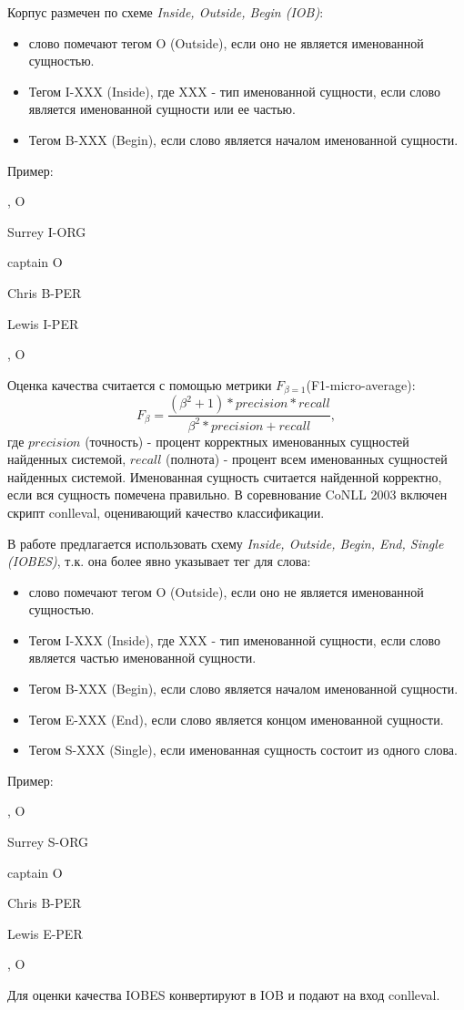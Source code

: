   Корпус размечен по схеме \textit{Inside, Outside, Begin (IOB)}:
  \begin{itemize}
  \item слово помечают тегом O (Outside), если оно не является именованной сущностью.
  \item Тегом I-XXX (Inside), где XXX - тип именованной сущности, если слово
    является именованной сущности или ее частью.
  \item Тегом B-XXX (Begin), если слово является началом именованной сущности.
  \end{itemize}

  Пример:
  \centerline{}
  \centerline{, O}
  \centerline{Surrey I-ORG}
  \centerline{captain O}
  \centerline{Chris B-PER}
  \centerline{Lewis I-PER}
  \centerline{, O}

  Оценка качества считается с помощью метрики $F_{\beta=1}$(F1-micro-average):
  \[
    F_\beta = \frac{(\beta^2 + 1) * precision * recall}{\beta^2*precision + recall},
  \]
  где $precision$ (точность) - процент корректных именованных сущностей
  найденных системой, $recall$ (полнота) - процент всем именованных сущностей
  найденных системой. Именованная сущность считается найденной корректно, если
  вся сущность помечена правильно.
  В соревнование CoNLL 2003 включен скрипт conlleval, оценивающий качество классификации.

  В работе \citep{collobert2011natural} предлагается использовать схему
  \textit{Inside, Outside, Begin, End, Single (IOBES)}, т.к. она более явно указывает
  тег для слова:
  \begin{itemize}
  \item слово помечают тегом O (Outside), если оно не является именованной сущностью.
  \item Тегом I-XXX (Inside), где XXX - тип именованной сущности, если слово является частью именованной сущности.
  \item Тегом B-XXX (Begin), если слово является началом именованной сущности.
  \item Тегом E-XXX (End), если слово является концом именованной сущности.
  \item Тегом S-XXX (Single), если именованная сущность состоит из одного слова.
  \end{itemize}

  Пример:
  \centerline{}
  \centerline{, O}
  \centerline{Surrey S-ORG}
  \centerline{captain O}
  \centerline{Chris B-PER}
  \centerline{Lewis E-PER}
  \centerline{, O}

  Для оценки качества IOBES конвертируют в IOB и подают на вход conlleval.

